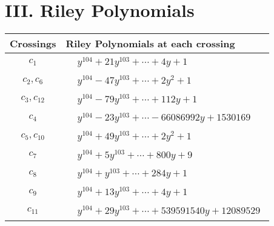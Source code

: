 \documentclass[1p]{elsarticle_modified}
\theoremstyle{definition}
\begin{document}
\centering \section*{ III. Riley Polynomials}
\begin{tabular}{m{50pt}|m{274pt}}
Crossings & \hspace{64pt}Riley Polynomials at each crossing \\
\hline $$\begin{aligned}c_{1}\end{aligned}$$&$\begin{aligned}
&y^{104}+21 y^{103}+\cdots+4 y+1
\end{aligned}$\\
\hline $$\begin{aligned}c_{2},c_{6}\end{aligned}$$&$\begin{aligned}
&y^{104}-47 y^{103}+\cdots+2 y^2+1
\end{aligned}$\\
\hline $$\begin{aligned}c_{3},c_{12}\end{aligned}$$&$\begin{aligned}
&y^{104}-79 y^{103}+\cdots+112 y+1
\end{aligned}$\\
\hline $$\begin{aligned}c_{4}\end{aligned}$$&$\begin{aligned}
&y^{104}-23 y^{103}+\cdots-66086992 y+1530169
\end{aligned}$\\
\hline $$\begin{aligned}c_{5},c_{10}\end{aligned}$$&$\begin{aligned}
&y^{104}+49 y^{103}+\cdots+2 y^2+1
\end{aligned}$\\
\hline $$\begin{aligned}c_{7}\end{aligned}$$&$\begin{aligned}
&y^{104}+5 y^{103}+\cdots+800 y+9
\end{aligned}$\\
\hline $$\begin{aligned}c_{8}\end{aligned}$$&$\begin{aligned}
&y^{104}+y^{103}+\cdots+284 y+1
\end{aligned}$\\
\hline $$\begin{aligned}c_{9}\end{aligned}$$&$\begin{aligned}
&y^{104}+13 y^{103}+\cdots+4 y+1
\end{aligned}$\\
\hline $$\begin{aligned}c_{11}\end{aligned}$$&$\begin{aligned}
&y^{104}+29 y^{103}+\cdots+539591540 y+12089529
\end{aligned}$\\
\hline
\end{tabular}
\vskip 2pc
\end{document}

